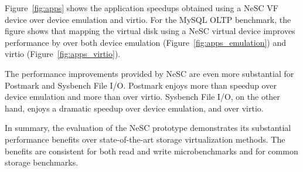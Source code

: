 Figure~\ref{fig:apps} shows the application speedups obtained using a NeSC VF device over device emulation and virtio. For the MySQL OLTP benchmark, the figure shows that mapping the virtual disk using a NeSC virtual device improves performance by  over both device emulation (Figure~\ref{fig:apps_emulation}) and virtio (Figure~\ref{fig:apps_virtio}).

The performance improvements provided by NeSC are even more substantial for Postmark and Sysbench File I/O.
Postmark enjoys more than  speedup over device emulation and more than  over virtio. Sysbench File I/O, on the other hand, enjoys a dramatic  speedup over device emulation, and  over virtio.

In summary, the evaluation of the NeSC prototype demonstrates its substantial performance benefits over state-of-the-art storage virtualization methods. The benefits are consistent for both read and write microbenchmarks and for common storage benchmarks.

